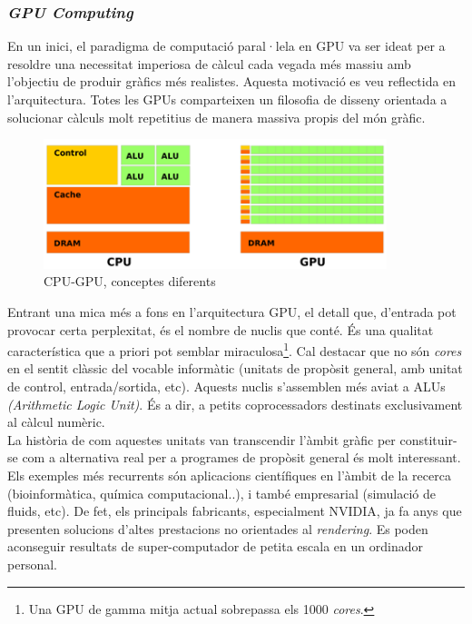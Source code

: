 \documentclass[11pt,a4paper]{article}
\begin{document}
\subsubsection{\textit{GPU Computing}}
En un inici, el paradigma de computació paral·lela en GPU va ser ideat per a resoldre una necessitat imperiosa de càlcul cada vegada més massiu amb l'objectiu de produir gràfics més realistes. Aquesta motivació es veu reflectida en l'arquitectura. Totes les GPUs comparteixen un filosofia de disseny orientada a solucionar càlculs molt repetitius de manera massiva propis del món gràfic.
\\

\begin{figure} [!h]
\centering
\includegraphics[width=10cm]{resources/cpu-gpu_w.png}
\caption{CPU-GPU, conceptes diferents}
\end{figure}

Entrant una mica més a fons en l'arquitectura GPU, el detall que, d'entrada pot provocar certa perplexitat, és el nombre de nuclis que conté. És una qualitat característica que a priori pot semblar  miraculosa\footnote{Una GPU de gamma mitja actual sobrepassa els 1000 \textit{cores}.}. Cal destacar que no són \textit{cores} en el sentit clàssic del vocable informàtic (unitats de propòsit general, amb unitat de control, entrada/sortida, etc). Aquests nuclis s'assemblen més aviat a ALUs \textit{(Arithmetic Logic Unit)}. És a dir, a petits coprocessadors destinats exclusivament al càlcul numèric.
\\

La història de com aquestes unitats van transcendir l'àmbit gràfic per constituir-se com a alternativa real per a programes de propòsit general  és molt interessant. Els exemples més recurrents són aplicacions científiques en l'àmbit de la recerca (bioinformàtica, química computacional..), i també empresarial (simulació de fluids, etc)\cite{CUDAapplications}. De fet, els principals fabricants, especialment NVIDIA, ja fa anys que presenten solucions d'altes prestacions no orientades al \textit{rendering}.  Es poden aconseguir resultats de super-computador de petita escala en un ordinador personal.
\\
\end{document}
